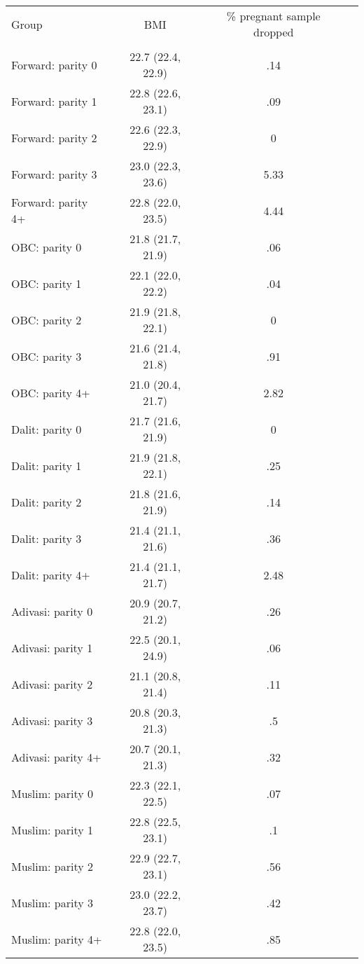 \begin{tabular}{lccc}
\toprule
Group & BMI & \% pregnant sample dropped \\\\
\midrule
Forward: parity 0&22.7 (22.4, 22.9)&.14\\
Forward: parity 1&22.8 (22.6, 23.1)&.09\\
Forward: parity 2&22.6 (22.3, 22.9)&0\\
Forward: parity 3&23.0 (22.3, 23.6)&5.33\\
Forward: parity 4+&22.8 (22.0, 23.5)&4.44\\
OBC: parity 0&21.8 (21.7, 21.9)&.06\\
OBC: parity 1&22.1 (22.0, 22.2)&.04\\
OBC: parity 2&21.9 (21.8, 22.1)&0\\
OBC: parity 3&21.6 (21.4, 21.8)&.91\\
OBC: parity 4+&21.0 (20.4, 21.7)&2.82\\
Dalit: parity 0&21.7 (21.6, 21.9)&0\\
Dalit: parity 1&21.9 (21.8, 22.1)&.25\\
Dalit: parity 2&21.8 (21.6, 21.9)&.14\\
Dalit: parity 3&21.4 (21.1, 21.6)&.36\\
Dalit: parity 4+&21.4 (21.1, 21.7)&2.48\\
Adivasi: parity 0&20.9 (20.7, 21.2)&.26\\
Adivasi: parity 1&22.5 (20.1, 24.9)&.06\\
Adivasi: parity 2&21.1 (20.8, 21.4)&.11\\
Adivasi: parity 3&20.8 (20.3, 21.3)&.5\\
Adivasi: parity 4+&20.7 (20.1, 21.3)&.32\\
Muslim: parity 0&22.3 (22.1, 22.5)&.07\\
Muslim: parity 1&22.8 (22.5, 23.1)&.1\\
Muslim: parity 2&22.9 (22.7, 23.1)&.56\\
Muslim: parity 3&23.0 (22.2, 23.7)&.42\\
Muslim: parity 4+&22.8 (22.0, 23.5)&.85\\
\bottomrule
\end{tabular}
